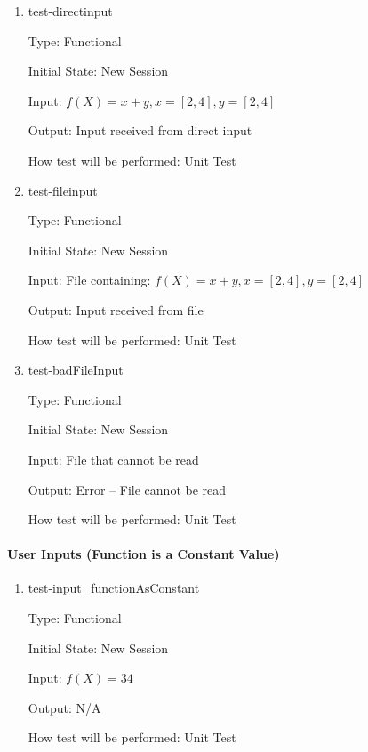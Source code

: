 \documentclass[12pt, titlepage]{article}
\begin{document}
\begin{enumerate}
	
	\item{test-directinput}
	
	Type: Functional
	
	Initial State: New Session
	
	Input: $f(X) = x + y, x = [2,4], y = [2,4]$
	
	Output: Input received from direct input
	
	How test will be performed: Unit Test\\
	
	\item{test-fileinput}

	Type: Functional
	
	Initial State: New Session
	
	Input: File containing: $f(X) = x + y, x = [2,4], y = [2,4]$
	
	Output: Input received from file
	
	How test will be performed: Unit Test\\
	
	\item{test-badFileInput}
	
	Type: Functional
	
	Initial State: New Session
	
	Input: File that cannot be read
	
	Output: Error -- File cannot be read
	
	How test will be performed: Unit Test\\
\end{enumerate}
	
\paragraph{User Inputs (Function is a Constant Value)}

\begin{enumerate}	
	\item{test-input\_functionAsConstant}
	
	Type: Functional
	
	Initial State: New Session
	
	Input: $f(X) = 34$
	
	Output: N/A
	
	How test will be performed: Unit Test\\
\end{enumerate}
	
\end{document}
